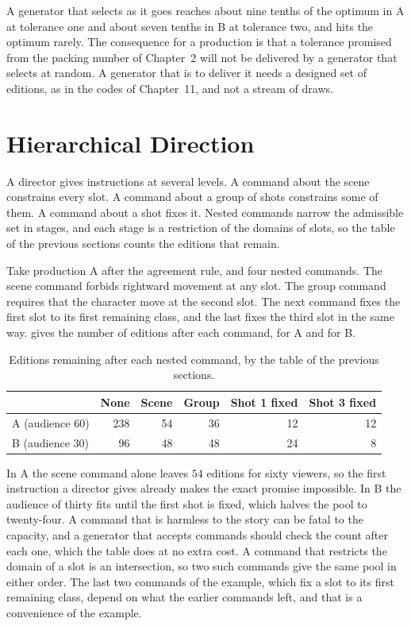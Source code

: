 \documentclass[11pt,twoside,openright]{book}
\theoremstyle{plain}
\theoremstyle{definition}
\theoremstyle{remark}
\begin{document}
A generator that selects as it goes reaches about nine tenths of the optimum in A at tolerance one and about seven tenths in B at tolerance two, and hits the optimum rarely. The consequence for a production is that a tolerance promised from the packing number of Chapter~2 will not be delivered by a generator that selects at random. A generator that is to deliver it needs a designed set of editions, as in the codes of Chapter~11, and not a stream of draws.

\section{Hierarchical Direction}\label{sec:direct16}

A director gives instructions at several levels. A command about the scene constrains every slot. A command about a group of shots constrains some of them. A command about a shot fixes it. Nested commands narrow the admissible set in stages, and each stage is a restriction of the domains of slots, so the table of the previous sections counts the editions that remain.

Take production A after the agreement rule, and four nested commands. The scene command forbids rightward movement at any slot. The group command requires that the character move at the second slot. The next command fixes the first slot to its first remaining class, and the last fixes the third slot in the same way.  gives the number of editions after each command, for A and for B.

\begin{table}[ht]
\centering
\begin{tabular}{@{}lrrrrr@{}}
\toprule
 & None & Scene & Group & Shot 1 fixed & Shot 3 fixed\\
\midrule
A (audience 60) & 238 & 54 & 36 & 12 & 12\\
B (audience 30) & 96 & 48 & 48 & 24 & 8\\
\bottomrule
\end{tabular}
\caption{Editions remaining after each nested command, by the table of the previous sections.}\label{tab:cmd16}
\end{table}

In A the scene command alone leaves $54$ editions for sixty viewers, so the first instruction a director gives already makes the exact promise impossible. In B the audience of thirty fits until the first shot is fixed, which halves the pool to twenty-four. A command that is harmless to the story can be fatal to the capacity, and a generator that accepts commands should check the count after each one, which the table does at no extra cost. A command that restricts the domain of a slot is an intersection, so two such commands give the same pool in either order. The last two commands of the example, which fix a slot to its first remaining class, depend on what the earlier commands left, and that is a convenience of the example.
\end{document}

